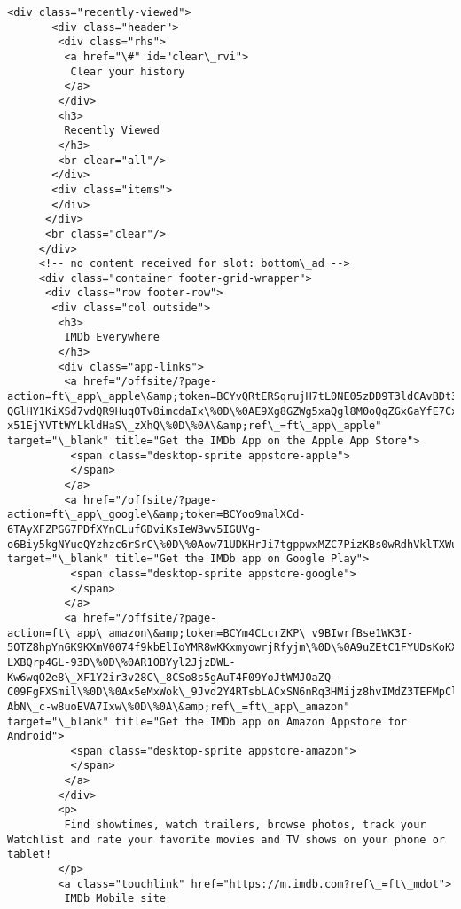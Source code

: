 \documentclass[11pt]{article}
\begin{document}
\begin{Verbatim}[commandchars=\\\{\}]
      <div class="recently-viewed">
       <div class="header">
        <div class="rhs">
         <a href="\#" id="clear\_rvi">
          Clear your history
         </a>
        </div>
        <h3>
         Recently Viewed
        </h3>
        <br clear="all"/>
       </div>
       <div class="items">
       </div>
      </div>
      <br class="clear"/>
     </div>
     <!-- no content received for slot: bottom\_ad -->
     <div class="container footer-grid-wrapper">
      <div class="row footer-row">
       <div class="col outside">
        <h3>
         IMDb Everywhere
        </h3>
        <div class="app-links">
         <a href="/offsite/?page-action=ft\_app\_apple\&amp;token=BCYvQRtERSqrujH7tL0NE05zDD9T3ldCAvBDt3BogChE-QGlHY1KiXSd7vdQR9HuqOTv8imcdaIx\%0D\%0AE9Xg8GZWg5xaQgl8M0oQqZGxGaYfE7Cx1ptXnE1Yhe4JH5W\_agb1Ku\_LB1ntuOMq59Jy3p3i1KtQ\%0D\%0A2\_Qow68eexli95puKU9jmaZFSrMUNLT85NIlNm4ZKU-x51EjYVTtWYLkldHaS\_zXhQ\%0D\%0A\&amp;ref\_=ft\_app\_apple" target="\_blank" title="Get the IMDb App on the Apple App Store">
          <span class="desktop-sprite appstore-apple">
          </span>
         </a>
         <a href="/offsite/?page-action=ft\_app\_google\&amp;token=BCYoo9malXCd-6TAyXFZPGG7PDfXYnCLufGDviKsIeW3wv5IGUVg-o6Biy5kgNYueQYzhzc6rSrC\%0D\%0Aow71UDKHrJi7tgppwxMZC7PizKBs0wRdhVklTXWuiRgvyUsrPUr9SdvodWUK1uUf4iMi5UHLZwwU\%0D\%0AeDgjpycsJpGSmD1yABYhxCcuTXM5Detqm0SrqwoVlJ5IMx67rsq477becwG2Wqx\_zQ\%0D\%0A\&amp;ref\_=ft\_app\_google" target="\_blank" title="Get the IMDb app on Google Play">
          <span class="desktop-sprite appstore-google">
          </span>
         </a>
         <a href="/offsite/?page-action=ft\_app\_amazon\&amp;token=BCYm4CLcrZKP\_v9BIwrfBse1WK3I-5OTZ8hpYnGK9KXmV0074f9kbElIoYMR8wKKxmyowrjRfyjm\%0D\%0A9uZEtC1FYUDsKoKXK6ZmziwG8h24dOGbTNSm0VTododtQQ3pBU2wVbHK2m27NJyd87odI4UUxBfX\%0D\%0A16Nrn3F3OuEaCaZa42xo2wqK22LjY5UqPIcn6by3ft\_LWz6KkfZWEBBVN2r\_KE-LXBQrp4GL-93D\%0D\%0AR1OBYyl2JjzDWL-Kw6wqO2e8\_XF1Y2ir3v28C\_8CSo8s5gAuT4F09YoJtWMJOaZQ-C09FgFXSmil\%0D\%0Ax5eMxWok\_9Jvd2Y4RTsbLACxSN6nRq3HMijz8hvIMdZ3TEFMpClfo\_j9EU\_LGqWPtAomxwS7J7O0\%0D\%0AdIwpdHoO6ryw-AbN\_c-w8uoEVA7Ixw\%0D\%0A\&amp;ref\_=ft\_app\_amazon" target="\_blank" title="Get the IMDb app on Amazon Appstore for Android">
          <span class="desktop-sprite appstore-amazon">
          </span>
         </a>
        </div>
        <p>
         Find showtimes, watch trailers, browse photos, track your Watchlist and rate your favorite movies and TV shows on your phone or tablet!
        </p>
        <a class="touchlink" href="https://m.imdb.com?ref\_=ft\_mdot">
         IMDb Mobile site

\end{Verbatim}
\end{document}
